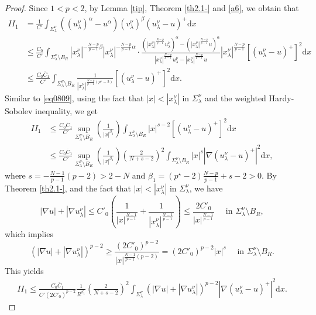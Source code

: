 \documentclass[12pt]{amsart}
\theoremstyle{definition}
\theoremstyle{remark}
\theoremstyle{conclusion}
\theoremstyle{conjecture}
\numberwithin{equation}{section}
\begin{document}
\begin{proof}
Since $1<p<2$, by Lemma \ref{tip}, Theorem \ref{th2.1-} and \eqref{a6},
we obtain that
\begin{align}\label{eq1005}
II_1 &= \frac{1}{C'} \int_{\Sigma_\lambda^\nu}   ((u^\nu
_{\lambda})^\alpha-u^\alpha)(v^\nu_{\lambda})^\beta (u^{\nu}_{\lambda}-u )^+ \mathrm{d}x \\
     &\leq \frac{C_0}{C'} \int_{\Sigma_\lambda^\nu\setminus B_R} |x^\nu_\lambda|^{-\frac{N-p}{p-1}\beta}|x^\nu_\lambda|^{-\frac{N-p}{p-1}\alpha}\cdot \frac{(|x^\nu_\lambda|^{\frac{N-p}{p-1}}u^\nu_\lambda)^\alpha-(|x^\nu_\lambda|^{\frac{N-p}{p-1}}u)^\alpha}{|x^\nu_\lambda|^{\frac{N-p}{p-1}}u^\nu_\lambda-|x^\nu_\lambda|^{\frac{N-p}{p-1}}u} |x^\nu_\lambda|^{\frac{N-p}{p-1}} [(u^{\nu}_{\lambda}-u )^+]^2 \mathrm{d}x \nonumber\\
     &\leq \frac{C_0 \overline{C}_1}{C'} \int_{\Sigma_\lambda^\nu\setminus B_R}  \frac{1}{|x^\nu_\lambda|^{\frac{N-p}{p-1}(p^\star-2)}} [(u^{\nu}_{\lambda}-u )^+]^2 \mathrm{d}x. \nonumber
\end{align}
 Similar to \eqref{eq0809}, using the fact that  $|x|<|x^{\nu}_{\lambda}|$ in $\Sigma^{\nu}_\lambda$ and the weighted Hardy-Sobolev inequality, we get
\begin{align}\label{eq10061}
II_1 &\leq \frac{C_0 \overline{C}_1}{C'} \sup_{\Sigma_\lambda^\nu\setminus B_R} \left(\frac{1}{|x|^{\beta_1}}\right)
      \int_{\Sigma_\lambda^\nu\setminus B_R} |x|^{s-2} [(u^{\nu}_{\lambda}-u )^+]^2 \mathrm{d}x \\
      &\leq \frac{C_0 \overline{C}_1}{C'} \sup_{\Sigma_\lambda^\nu\setminus B_R} \left(\frac{1}{|x|^{\beta_1}}\right)
      \left(\frac{2}{N+s-2}\right)^2 \int_{\Sigma_\lambda^\nu\setminus B_R} |x|^s |\nabla(u^{\nu}_{\lambda}-u )^+|^2 \mathrm{d}x, \nonumber
\end{align}
where $s =-\frac{N-1}{p-1}(p-2)>2-N$ and $\beta_1=(p^\star -2)\frac{N-p}{p-1} +s-2>0$. By Theorem \ref{th2.1-}, and the fact that $|x|<|x^{\nu}_{\lambda}|$ in $\Sigma^{\nu}_\lambda$, we have
$$|\nabla u|+|\nabla u^{\nu}_{\lambda}| \leq C'_0 \left( \frac{1}{|x|^\frac{N-1}{p-1}} + \frac{1}{|x^{\nu}_{\lambda}|^\frac{N-1}{p-1}} \right) \leq
  \frac{2C'_0}{|x|^\frac{N-1}{p-1}} \,\,\quad \mbox{in}\,\,\Sigma_\lambda^\nu\setminus B_R,$$
which implies
$$(|\nabla u|+|\nabla u^{\nu}_{\lambda}|)^{p-2} \geq
  \frac{(2C'_0)^{p-2}}{|x|^{\frac{N-1}{p-1}(p-2)}}=(2C'_0)^{p-2} |x|^s  \quad \,\,\mbox{in}\,\,\Sigma_\lambda^\nu\setminus B_R.$$
This yields
\begin{align}\label{eq1006}
II_1 \leq  \frac{ C_0\overline{C}_1}{C'(2C'_0)^{p-2}} \frac{1}{R^{\beta_1}}
           \left(\frac{2}{N+s-2}\right)^2\int_{\Sigma_\lambda^\nu} (|\nabla u|+|\nabla u^{\nu}_{\lambda}|)^{p-2} |\nabla(u^{\nu}_{\lambda}-u )^+|^2 \mathrm{d}x.
\end{align}


\end{proof}
\end{document}
